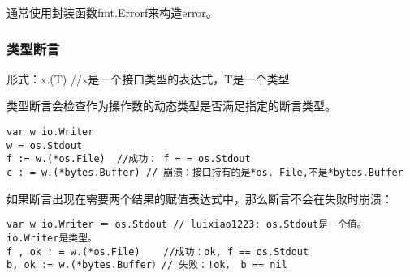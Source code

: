 通常使用封装函数fmt.Errorf来构造error。

\hypertarget{ux7c7bux578bux65adux8a00}{%
\subsubsection{类型断言}\label{ux7c7bux578bux65adux8a00}}

形式：x.(T) //x是一个接口类型的表达式，T是一个类型

类型断言会检查作为操作数的动态类型是否满足指定的断言类型。

\begin{verbatim}
var w io.Writer
w = os.Stdout
f := w.(*os.File)  //成功： f = = os.Stdout
c : = w.(*bytes.Buffer) // 崩溃：接口持有的是*os. File,不是*bytes.Buffer
\end{verbatim}

如果断言出现在需要两个结果的赋值表达式中，那么断言不会在失败时崩溃：

\begin{verbatim}
var w io.Writer ＝ os.Stdout // luixiao1223: os.Stdout是一个值。 io.Writer是类型。
f , ok : = w.(*os.File)    //成功：ok, f == os.Stdout
b, ok := w.(*bytes.Buffer）// 失败：!ok， b == nil
\end{verbatim}
